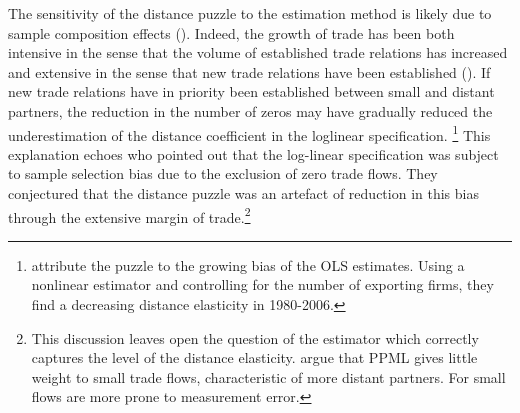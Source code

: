 \documentclass[12pt,twoside,a4paper,notitlepage]{article}
\begin{document}
The sensitivity of the distance puzzle to the estimation method is likely due to sample composition effects (\cite{Head2013,Larch2016}).
Indeed, the growth of trade has been both intensive in the sense that the volume of established trade relations has increased and extensive in the sense that new trade relations have been established (\cite{Helpman2008, Baldwin2011}).
If new trade relations have in priority been established between small and distant partners, the reduction in the number of zeros may have gradually reduced the underestimation of the distance coefficient in the loglinear specification.
\footnote{\cite{Larch2016} attribute the puzzle to the growing bias of the OLS estimates.
Using a nonlinear estimator and controlling for the number of exporting firms, they find a decreasing distance elasticity in 1980-2006.}
This explanation echoes \cite{Felbermayr2006} who pointed out that the log-linear specification was subject to sample selection bias due to the exclusion of zero trade flows.
They conjectured that the distance puzzle was an artefact of reduction in this bias through the extensive margin of trade.\footnote{This discussion leaves open the question of the estimator which correctly captures the level of the distance elasticity.
\cite{Head2013} argue that PPML gives little weight to small trade flows, characteristic of more distant partners.
For \cite{SantosSilva2006} small flows are more prone to measurement error.}
\end{document}
